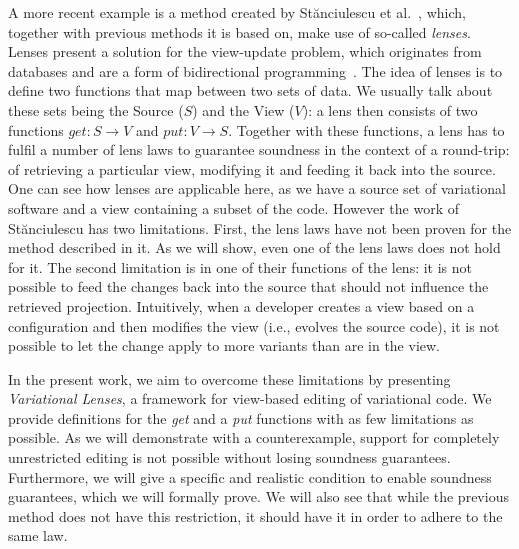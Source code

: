 A more recent example is a method created by St{\u{a}}nciulescu et al.~\cite{stuanciulescu2016}, which, together with previous methods it is based on, make use of
so-called \emph{lenses}. Lenses present a solution for the view-update problem, which
originates from databases and are a form of bidirectional programming~\cite{foster2007}.
The idea of lenses is to define two functions that map between two sets of
data. We usually talk about these sets being the Source ($S$) and the View ($V$):
a lens then consists of two functions \(\mathit{get} : S \rightarrow V\) and
\(\mathit{put} : V \rightarrow S\). Together with these functions, a lens has to fulfil a number of
lens laws to guarantee soundness in the context of a round-trip: of retrieving a particular
view, modifying it and feeding it back into the source. One can see how 
lenses are applicable here, as we have a source set of variational software and a
view containing a subset of the code. However the work of St{\u{a}}nciulescu has two limitations. First, the
lens laws have not been proven for the method described in it. As we will show, even one of the lens laws does not hold for it.
The second limitation is in one of their functions of the lens: it is not possible to feed the changes
back into the source that should not influence the retrieved projection. Intuitively, when a developer creates a view based on a configuration and then modifies the view (i.e., evolves the source code), it is not possible to let the change apply to more variants than are in the view.

In the present work, we aim to overcome these limitations by presenting \emph{Variational Lenses}, a framework for view-based editing of variational code. We provide definitions for the \emph{get} and a \emph{put} functions with as few limitations as possible. As we will demonstrate with a 
counterexample, support for completely unrestricted editing is not possible without
losing soundness guarantees. Furthermore, we will give a specific and realistic
condition to enable soundness guarantees, which we will formally prove.
We will also see that while the previous
method does not have this restriction, it should have it in order to adhere to the
same law. 

